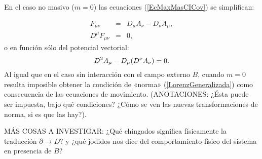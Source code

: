 En el caso no masivo ($m=0$) las ecuaciones (\ref{EcMaxMasCICov}) se simplifican:

\begin{subequations}\label{EcMaxNoMasCI}
 \begin{eqnarray}
  F_{\mu\nu} & = & D_\mu A_\nu -D_\nu A_\mu,\\
  D^{\mu}F_{\mu\nu}&=&0,
 \end{eqnarray}
\end{subequations}
o en función sólo del potencial vectorial:
\begin{equation}\label{EcMaxNoMasVectorialCI}
 D^2 A_\mu-D_\mu (D^\nu A_\nu)=0.\\
\end{equation}
Al igual que en el caso sin interacción con el campo externo $B$, cuando $m=0$ resulta imposible obtener la condición de «norma» (\ref{LorenzGeneralizada}) como consecuencia de las ecuaciones de movimiento. (ANOTACIONES: ¿Ésta puede ser impuesta, bajo qué condiciones? ¿Cómo se ven las nuevas transformaciones de norma, si es que las hay?). 

MÁS COSAS A INVESTIGAR: ¿Qué chingados significa físicamente la traducción $\partial \rightarrow D$? y ¿qué jodidos nos dice del comportamiento físico del sistema en presencia de $B$?
